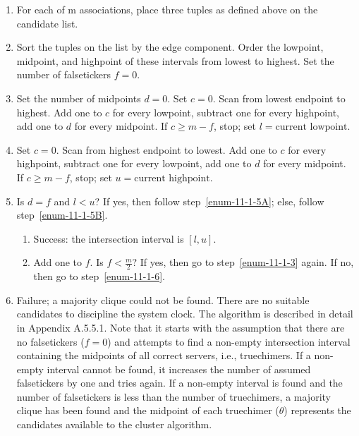 \begin{enumerate}
  \item For each of m associations, place three tuples as defined above
    on the candidate list.

  \item Sort the tuples on the list by the edge component. Order the
    lowpoint, midpoint, and highpoint of these intervals from lowest to
    highest. Set the number of falsetickers $ f = 0 $.

  \item \label{enum-11-1-3} Set the number of midpoints $ d = 0 $. Set $ c = 0 $. Scan from lowest
    endpoint to highest. Add one to $c$ for every lowpoint, subtract one
    for every highpoint, add one to $d$ for every midpoint. If $ c \geq m - f $,
    stop; set $l = \text{current lowpoint}$.

  \item Set $ c = 0 $. Scan from highest endpoint to lowest. Add one to $c$
    for every highpoint, subtract one for every lowpoint, add one to $d$
    for every midpoint. If $ c \geq m - f $, stop; set $u = \text{current highpoint}$.

  \item \label{enum-11-1-5} Is $ d = f $ and $ l < u $? If yes, then follow step~\ref{enum-11-1-5A}; else, follow
    step~\ref{enum-11-1-5B}.

    \begin{enumerate}
      \item \label{enum-11-1-5A} Success: the intersection interval is $ [l, u] $.

      \item \label{enum-11-1-5B} Add one to $ f $. Is $ f < \frac{m}{2} $? If yes, then go to step~\ref{enum-11-1-3} again.
        If no, then go to step~\ref{enum-11-1-6}.
    \end{enumerate}

  \item \label{enum-11-1-6} Failure; a majority clique could not be found. There are no
    suitable candidates to discipline the system clock.
    The algorithm is described in detail in Appendix A.5.5.1. Note that
    it starts with the assumption that there are no falsetickers ($ f = 0 $)
    and attempts to find a non-empty intersection interval containing the
    midpoints of all correct servers, i.e., truechimers. If a non-empty
    interval cannot be found, it increases the number of assumed
    falsetickers by one and tries again. If a non-empty interval is
    found and the number of falsetickers is less than the number of
    truechimers, a majority clique has been found and the midpoint of
    each truechimer ($ \theta $) represents the candidates available to the
    cluster algorithm.


\end{enumerate}
